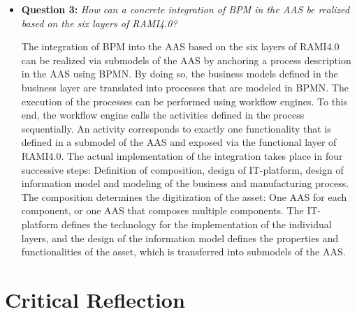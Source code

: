 \begin{itemize}
    \item[] \textbf{Question 3:} \textit{How can a concrete integration of \ac{BPM} in the \ac{AAS} be realized based on the six layers of \ac{RAMI4.0}?}
    
    The integration of \ac{BPM} into the \ac{AAS} based on the six layers of \ac{RAMI4.0} can be realized via submodels of the \ac{AAS} by anchoring a process description in the \ac{AAS} using \ac{BPMN}. By doing so, the business models defined in the business layer are translated into processes that are modeled in \ac{BPMN}. The execution of the processes can be performed using workflow engines. To this end, the workflow engine calls the activities defined in the process sequentially. An activity corresponds to exactly one functionality that is defined in a submodel of the \ac{AAS} and exposed via the functional layer of \ac{RAMI4.0}. The actual implementation of the integration takes place in four successive steps: Definition of composition, design of IT-platform, design of information model and modeling of the business and manufacturing process. The composition determines the digitization of the asset: One \ac{AAS} for each component, or one \ac{AAS} that composes multiple components. The IT-platform defines the technology for the implementation of the individual layers, and the design of the information model defines the properties and functionalities of the asset, which is transferred into submodels of the \ac{AAS}.

\end{itemize}

\section{Critical Reflection}

